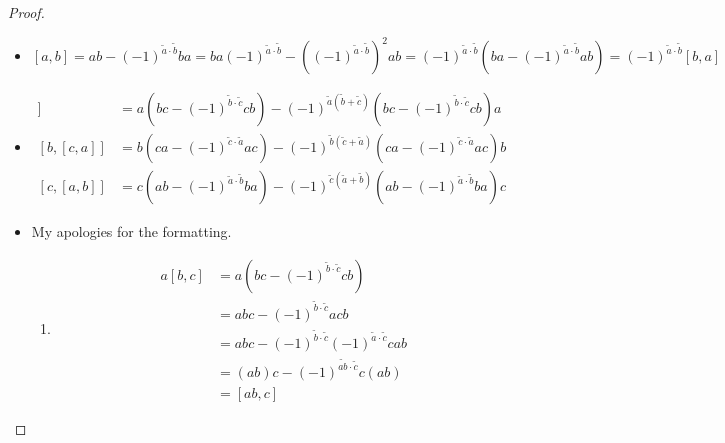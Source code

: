 \documentclass[a4paper,10pt]{scrreprt}
\theoremstyle{definition}
\theoremstyle{plain}
\theoremstyle{remark}
\begin{document}
\begin{proof}
  $\,$
  \begin{itemize}
    \item $[a,b] = ab-(-1)^{\tilde{a}\cdot \tilde{b}} ba = ba(-1)^{\tilde{a}\cdot \tilde{b}} - \left( (-1)^{\tilde{a}\cdot \tilde{b}} \right)^{2} ab = (-1)^{\tilde{a}\cdot \tilde{b}}\left( ba - (-1)^{\tilde{a}\cdot \tilde{b}}ab \right) = (-1)^{\tilde{a}\cdot \tilde{b}}[b,a] $
    \item 
      \begin{align*}
        [a,[b,c]] &= a(bc-(-1)^{\tilde{b}\cdot \tilde{c}}cb) - (-1)^{\tilde{a}(\tilde{b} + \tilde{c})}(bc-(-1)^{\tilde{b}\cdot \tilde{c}}cb)a \\
        [b,[c,a]] &= b(ca-(-1)^{\tilde{c}\cdot \tilde{a}}ac) - (-1)^{\tilde{b}(\tilde{c} + \tilde{a})}(ca-(-1)^{\tilde{c}\cdot \tilde{a}}ac)b \\
        [c,[a,b]] &= c(ab-(-1)^{\tilde{a}\cdot \tilde{b}}ba) - (-1)^{\tilde{c}(\tilde{a} + \tilde{b})}(ab-(-1)^{\tilde{a}\cdot \tilde{b}}ba)c 
      \end{align*}

    \item My apologies for the formatting.
      \begin{enumerate}[label= Equality \arabic*:]
        \item 
          \begin{align*}
            a[b,c] &= a(bc-(-1)^{\tilde{b}\cdot \tilde{c}}cb) \\
            &= abc-(-1)^{\tilde{b}\cdot \tilde{c}}acb \\
            &= abc-(-1)^{\tilde{b}\cdot \tilde{c}} (-1)^{\tilde{a}\cdot \tilde{c}}cab\\
            &=(ab)c - (-1)^{\tilde{ab}\cdot \tilde{c}} c(ab) \\
            &= [ab,c]
          \end{align*}


\end{enumerate}
\end{itemize}
\end{proof}
\end{document}
